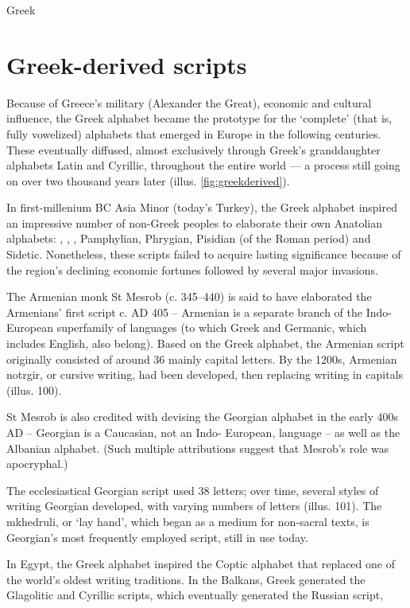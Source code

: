 \medskip
\begin{scriptexample}[]{Greek}
\end{scriptexample}




\section{Greek-derived scripts}

Because of Greece’s military (Alexander the Great), economic
and cultural influence, the Greek alphabet became the
prototype for the ‘complete’ (that is, fully vowelized) alphabets
that emerged in Europe in the following centuries. These eventually
diffused, almost exclusively through Greek’s granddaughter
alphabets Latin and Cyrillic, throughout the entire
world --- a process still going on over two thousand years later
(illus. \ref{fig:greekderived}).

In first-millenium BC Asia Minor (today’s Turkey), the
Greek alphabet inspired an impressive number of non-Greek
peoples to elaborate their own Anatolian alphabets: ,
, , Pamphylian, Phrygian, Pisidian (of the Roman
period) and Sidetic.  Nonetheless, these scripts failed to
acquire lasting significance because of the region’s declining
economic fortunes followed by several major invasions.



The Armenian monk St Mesrob (c. 345–440) is said to have
elaborated the Armenians’ first script c. AD 405 – Armenian is a
separate branch of the Indo-European superfamily of languages
(to which Greek and Germanic, which includes English, also
belong). Based on the Greek alphabet, the Armenian script
originally consisted of around 36 mainly capital letters. By the
1200s, Armenian notrgir, or cursive writing, had been developed,
then replacing writing in capitals (illus. 100).

St Mesrob is also credited with devising the Georgian alphabet
in the early 400s AD – Georgian is a Caucasian, not an Indo-
European, language – as well as the Albanian alphabet. (Such
multiple attributions suggest that Mesrob’s role was apocryphal.)

The ecclesiastical Georgian script used 38 letters; over
time, several styles of writing Georgian developed, with varying
numbers of letters (illus. 101). The mkhedruli, or ‘lay hand’,
which began as a medium for non-sacral texts, is Georgian’s
most frequently employed script, still in use today.

In Egypt, the Greek alphabet inspired the Coptic
alphabet that replaced one of the world’s oldest writing traditions.
In the Balkans, Greek generated the Glagolitic and
Cyrillic scripts, which eventually generated the Russian script,







